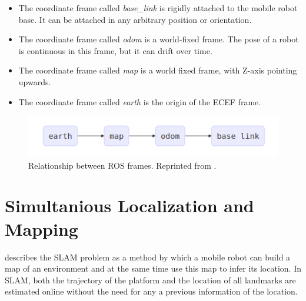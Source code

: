 \begin{itemize}
	\item The coordinate frame called \textit{base\_link} is rigidly attached to the mobile robot base. It can be attached in any arbitrary position or orientation.
	\item The coordinate frame called \textit{odom} is a world-fixed frame. The pose of a robot is continuous in this frame, but it can drift over time.
	\item The coordinate frame called \textit{map} is a world fixed frame, with Z-axis pointing upwards. 
	\item The coordinate frame called \textit{earth} is the origin of the ECEF frame.
\end{itemize}

\begin{figure}
	\centering
	\includegraphics[width=5in]{figures/ros_rel_frames}
	\caption[Relation between ROS frames]{\small 
	Relationship between ROS frames. Reprinted from . }
	\label{fig:rosrefframes}
\end{figure}

\section{Simultanious Localization and Mapping}

 describes the SLAM problem as a method by which a mobile robot can build a map of an environment and at the same time use this map to infer its location. In SLAM, both the trajectory of the platform and the location of all landmarks are estimated online without the
need for any a previous information of the location.

